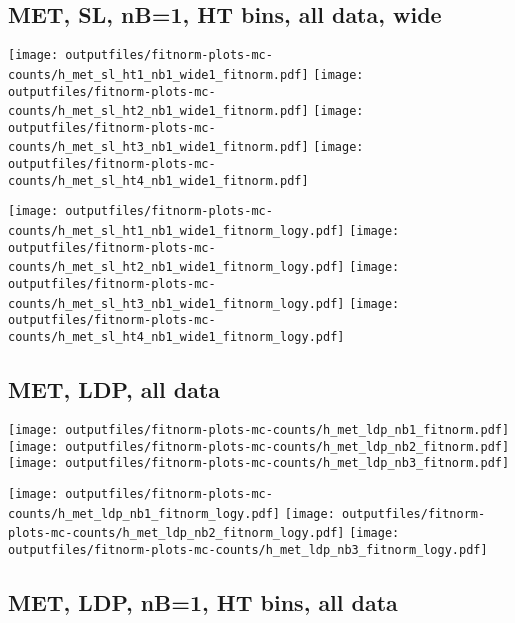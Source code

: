 \documentclass[11pt]{article}
\begin{document}
     \clearpage
     \subsection{ MET, SL, nB=1, HT bins, all data, wide}

    \noindent
     \texttt{[image: outputfiles/fitnorm-plots-mc-counts/h\_met\_sl\_ht1\_nb1\_wide1\_fitnorm.pdf]}
     \texttt{[image: outputfiles/fitnorm-plots-mc-counts/h\_met\_sl\_ht2\_nb1\_wide1\_fitnorm.pdf]}
     \texttt{[image: outputfiles/fitnorm-plots-mc-counts/h\_met\_sl\_ht3\_nb1\_wide1\_fitnorm.pdf]}
     \texttt{[image: outputfiles/fitnorm-plots-mc-counts/h\_met\_sl\_ht4\_nb1\_wide1\_fitnorm.pdf]}

    \noindent
     \texttt{[image: outputfiles/fitnorm-plots-mc-counts/h\_met\_sl\_ht1\_nb1\_wide1\_fitnorm\_logy.pdf]}
     \texttt{[image: outputfiles/fitnorm-plots-mc-counts/h\_met\_sl\_ht2\_nb1\_wide1\_fitnorm\_logy.pdf]}
     \texttt{[image: outputfiles/fitnorm-plots-mc-counts/h\_met\_sl\_ht3\_nb1\_wide1\_fitnorm\_logy.pdf]}
     \texttt{[image: outputfiles/fitnorm-plots-mc-counts/h\_met\_sl\_ht4\_nb1\_wide1\_fitnorm\_logy.pdf]}


     \clearpage


    \subsection{ MET, LDP, all data}

    \noindent
     \texttt{[image: outputfiles/fitnorm-plots-mc-counts/h\_met\_ldp\_nb1\_fitnorm.pdf]}
     \texttt{[image: outputfiles/fitnorm-plots-mc-counts/h\_met\_ldp\_nb2\_fitnorm.pdf]}
     \texttt{[image: outputfiles/fitnorm-plots-mc-counts/h\_met\_ldp\_nb3\_fitnorm.pdf]}

    \noindent
     \texttt{[image: outputfiles/fitnorm-plots-mc-counts/h\_met\_ldp\_nb1\_fitnorm\_logy.pdf]}
     \texttt{[image: outputfiles/fitnorm-plots-mc-counts/h\_met\_ldp\_nb2\_fitnorm\_logy.pdf]}
     \texttt{[image: outputfiles/fitnorm-plots-mc-counts/h\_met\_ldp\_nb3\_fitnorm\_logy.pdf]}


     \subsection{ MET, LDP, nB=1, HT bins, all data}
\end{document}
